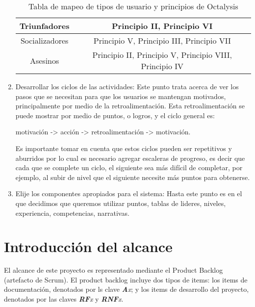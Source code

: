 \begin{enumerate}
    \begin{table}[h!]
\centering
\begin{tabular}{|c|c|} 
 \hline
 Triunfadores & Principio II, Principio VI \\
 \hline
  Socializadores &  Principio V, Principio III, Principio VII\\
 \hline
 Asesinos & Principio II, Principio V, Principio VIII, Principio IV \\
 \hline
\end{tabular}
\caption{Tabla de mapeo de tipos de usuario y principios de Octalysis}
\label{table:usuariosvprincipios}
\end{table}
    
    \item Desarrollar los ciclos de las actividades:
    Este punto trata acerca de ver los pasos que se necesitan para que los usuarios se mantengan motivados, principalmente por medio de la retroalimentación. Esta retroalimentación se puede mostrar por medio de puntos, o logros, y el ciclo general es:\par\hfill motivación -> acción -> retroalimentación -> motivación. \hfill
    
    Es importante tomar en cuenta que estos ciclos pueden ser repetitivos y aburridos por lo cual es necesario agregar escaleras de progreso, es decir que cada que se complete un ciclo, el siguiente sea más difícil de completar, por ejemplo, al subir de nivel que el siguiente necesite más puntos para obtenerse.
    
    \item Elije los componentes apropiados para el sistema:
    Hasta este punto es en el que decidimos que queremos utilizar puntos, tablas de lideres, niveles, experiencia, competencias, narrativas. 
    
       
\end{enumerate}

\section{Introducción del alcance}

El alcance de este proyecto es representado mediante el Product Backlog (artefacto de Scrum). El product backlog incluye dos tipos de items: los items de documentación, denotados por ls clave {\it {\bf A}x}; y los items de desarrollo del proyecto, denotados por las claves {\it {\bf RF}x} y {\it{\bf RNF}x}.\\

